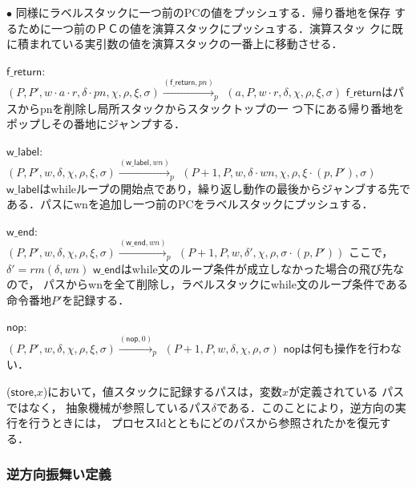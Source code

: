 \documentclass[submit,PRO]{ipsj}
\newcommand{\bcode}[1]{$\mathsf{#1}$}
\begin{document}
\begin{list}{$\bullet$}{}
      同様にラベルスタックに一つ前のPCの値をプッシュする．帰り番地を保存
      するために一つ前のＰＣの値を演算スタックにプッシュする．演算スタッ
      クに既に積まれている実引数の値を演算スタックの一番上に移動させる．
\item \bcode{f\_return}:\\
$(P,P',w\cdot a\cdot r,\delta\cdot pn,\chi,\rho,\xi,\sigma)\xrightarrow{(\mathsf{f\_return},pn)}_p$\newline
\qquad $(a,P,w\cdot r,\delta,\chi,\rho,\xi,\sigma)$\newline
\bcode{f\_return}はパスからpnを削除し局所スタックからスタックトップの一
      つ下にある帰り番地をポップしその番地にジャンプする．
\item \bcode{w\_label}:\\
$(P,P',w,\delta,\chi,\rho,\xi,\sigma)\xrightarrow{(\mathsf{w\_label},wn)}_p$\newline
\qquad $(P+1,P,w,\delta\cdot wn,\chi,\rho,\xi\cdot(p,P'),\sigma)$\newline
\bcode{w\_label}はwhileループの開始点であり，繰り返し動作の最後からジャンブする先である．パスにwnを追加し一つ前のPCをラベルスタックにプッシュする．
\item \bcode{w\_end}:\\
$(P,P',w,\delta,\chi,\rho,\xi,\sigma)\xrightarrow{(\mathsf{w\_end},wn)}_p$\newline
\qquad $(P+1,P,w,\delta',\chi,\rho,\sigma\cdot(p,P'))$\newline
ここで，$\delta'=rm(\delta,wn)$\newline
\bcode{w\_end}はwhile文のループ条件が成立しなかった場合の飛び先なので，
パスからwnを全て削除し，ラベルスタックにwhile文のループ条件である命令番地$P'$を記録する．
\item \bcode{nop}:\\
$(P,P',w,\delta,\chi,\rho,\xi,\sigma)\xrightarrow{(\mathsf{nop},0)}_p$\newline
\qquad $(P+1,P,w,\delta,\chi,\rho,\sigma)$\newline
\bcode{nop}は何も操作を行わない．
\end{list}

(\bcode{store},$x$)において，値スタックに記録するパスは，変数$x$が定義されている
パスではなく，
抽象機械が参照しているパス$\delta$である．このことにより，逆方向の実行を行うときには，
プロセスIdとともにどのパスから参照されたかを復元する．

\subsubsection{逆方向振舞い定義}
\end{document}
